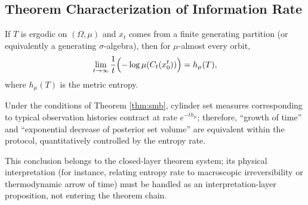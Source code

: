 \subsection{Theorem Characterization of Information Rate}

\begin{theorem}\label{thm:smb}
If $T$ is ergodic on $(\Omega,\mu)$ and $x_t$ comes from a finite generating partition (or equivalently a generating $\sigma$-algebra), then for $\mu$-almost every orbit,
\[
\lim_{t\to\infty}\frac{1}{t}\Bigl(-\log\mu(C_t(x_0^t))\Bigr)=h_\mu(T),
\]
where $h_\mu(T)$ is the metric entropy.
\end{theorem}

\begin{corollary}\label{cor:time-arrow}
Under the conditions of Theorem \ref{thm:smb}, cylinder set measures corresponding to typical observation histories contract at rate $e^{-t h_\mu}$; therefore, ``growth of time'' and ``exponential decrease of posterior set volume'' are equivalent within the protocol, quantitatively controlled by the entropy rate.
\end{corollary}

\begin{remark}
This conclusion belongs to the closed-layer theorem system; its physical interpretation (for instance, relating entropy rate to macroscopic irreversibility or thermodynamic arrow of time) must be handled as an interpretation-layer proposition, not entering the theorem chain.
\end{remark}
